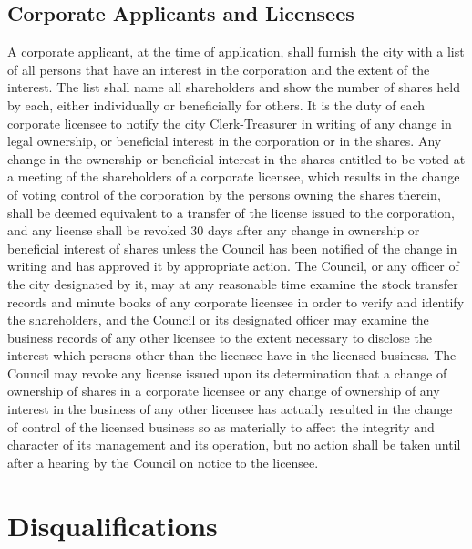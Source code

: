 \subsection{Corporate Applicants and Licensees}
A corporate applicant, at the time of application, shall furnish the city with a list of all persons that have an interest in the corporation and the extent of the interest.  The list shall name all shareholders and show the number of shares held by each, either individually or beneficially for others.  It is the duty of each corporate licensee to notify the city Clerk-Treasurer in writing of any change in legal ownership, or beneficial interest in the corporation or in the shares.  Any change in the ownership or beneficial interest in the shares entitled to be voted at a meeting of the shareholders of a corporate licensee, which results in the change of voting control of the corporation by the persons owning the shares therein, shall be deemed equivalent to a transfer of the license issued to the corporation, and any license shall be revoked 30 days after any change in ownership or beneficial interest of shares unless the Council has been notified of the change in writing and has approved it by appropriate action.  The Council, or any officer of the city designated by it, may at any reasonable time examine the stock transfer records and minute books of any corporate licensee in order to verify and identify the shareholders, and the Council or its designated officer may examine the business records of any other licensee to the extent necessary to disclose the interest which persons other than the licensee have in the licensed business.  The Council may revoke any license issued upon its determination that a change of ownership of shares in a corporate licensee or any change of ownership of any interest in the business of any other licensee has actually resulted in the change of control of the licensed business so as materially to affect the integrity and character of its management and its operation, but no action shall be taken until after a hearing by the Council on notice to the licensee.

\section{Disqualifications}
